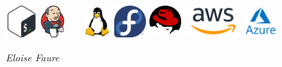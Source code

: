 \documentclass[]{friggeri-cv}
\begin{document}
\begin{bottom}
\includegraphics[height=12mm]{logo/bash-logo.png} \qquad \qquad %
\includegraphics[height=12mm]{logo/jenkins-logo.png} \qquad  \qquad  %
~
~
\includegraphics[height=12mm]{logo/linux-logo.png} \qquad \qquad \qquad  %
\includegraphics[height=12mm]{logo/fedora-logo.png} \qquad \qquad \qquad %
\includegraphics[height=12mm]{logo/redhat-logo.png} \qquad \qquad  \qquad%
\includegraphics[height=12mm]{logo/aws-logo.png}\qquad\qquad  \qquad %
\includegraphics[height=12mm]{logo/azure-logo.png} 
~ %
\begin{flushleft} %
	\emph{Eloise Faure} %
\end{flushleft} %
\end{bottom}
\end{document}
